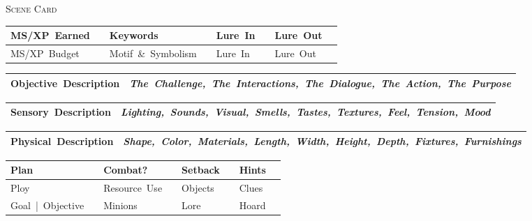 \documentclass[letterpaper,10pt]{article}
\begin{document}
\begin{center}
  {\Large\scshape Scene Card}
\end{center}

\begin{tabularx}{\textwidth}{|L|B|L|B|L|B|L|B|}
\hline
MS/XP Earned  &  & Keywords            &  & Lure In &  & Lure Out &  \\ \hline
MS/XP Budget  &  & Motif \& Symbolism  &  & Lure In &  & Lure Out &  \\ \hline
\end{tabularx}

\vspace{1em}

\begin{tabularx}{\textwidth}{|L|X|}
\hline
Objective Description &
  \emph{The Challenge, The Interactions, The Dialogue, The Action, The Purpose}\\[10em] \hline
\end{tabularx}

\vspace{0.4em}

\begin{tabularx}{\textwidth}{|L|X|}
\hline
Sensory Description &
  \emph{Lighting, Sounds, Visual, Smells, Tastes, Textures, Feel, Tension, Mood}\\[10em] \hline
\end{tabularx}

\vspace{0.4em}

\begin{tabularx}{\textwidth}{|L|X|}
\hline
Physical Description &
  \emph{Shape, Color, Materials, Length, Width, Height, Depth, Fixtures, Furnishings}\\[10em] \hline
\end{tabularx}

\vspace{1em}

\begin{tabularx}{\textwidth}{|L|B|L|B|L|B|L|B|}
\hline
Plan              & & Combat?       & & Setback & & Hints  & \\ \hline
Ploy              & & Resource Use  & & Objects & & Clues  & \\ \hline
Goal | Objective  & & Minions       & & Lore    & & Hoard  & \\ \hline
\end{tabularx}
\end{document}
